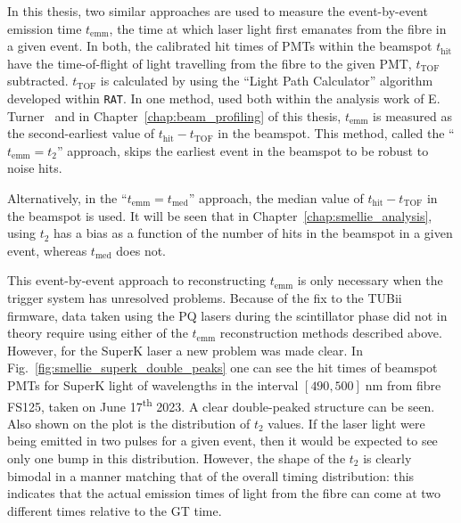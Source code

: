 In this thesis, two similar approaches are used to measure the event-by-event emission time $t_{\mathrm{emm}}$, the time at which laser light first emanates from the fibre in a given event. In both, the calibrated hit times of PMTs within the beamspot $t_{\mathrm{hit}}$ have the time-of-flight of light travelling from the fibre to the given PMT, $t_{\mathrm{TOF}}$ subtracted. $t_{\mathrm{TOF}}$ is calculated by using the ``Light Path Calculator'' algorithm developed within \texttt{RAT}. In one method, used both within the analysis work of E. Turner~\cite{turnerMeasurementScatteringCharacteristics2022} %
and in Chapter~\ref{chap:beam_profiling} of this thesis, $t_{\mathrm{emm}}$ is measured as the second-earliest value of $t_{\mathrm{hit}}-t_{\mathrm{TOF}}$ in the beamspot. This method, called the ``$t_{\mathrm{emm}} = t_{2}$'' approach, skips the earliest event in the beamspot to be robust to noise hits.

Alternatively, in the ``$t_{\mathrm{emm}} = t_{\mathrm{med}}$'' approach, the median value of $t_{\mathrm{hit}}-t_{\mathrm{TOF}}$ in the beamspot is used. It will be seen that in Chapter~\ref{chap:smellie_analysis}, using $t_{2}$ has a bias as a function of the number of hits in the beamspot in a given event, whereas $t_{\mathrm{med}}$ does not.

This event-by-event approach to reconstructing $t_{\mathrm{emm}}$ is only necessary when the trigger system has unresolved problems. Because of the fix to the TUBii firmware, data taken using the PQ lasers during the scintillator phase did not in theory require using either of the $t_{\mathrm{emm}}$ reconstruction methods described above. However, for the SuperK laser a new problem was made clear. In Fig.~\ref{fig:smellie_superk_double_peaks} one can see the hit times of beamspot PMTs for SuperK light of wavelengths in the interval $[490,500]\;\si{\nm}$ from fibre FS125, taken on June 17\textsuperscript{th} 2023. %
A clear double-peaked structure can be seen. Also shown on the plot is the distribution of $t_{2}$ values. If the laser light were being emitted in two pulses for a given event, then it would be expected to see only one bump in this distribution. However, the shape of the $t_{2}$ is clearly bimodal in a manner matching that of the overall timing distribution: this indicates that the actual emission times of light from the fibre can come at two different times relative to the GT time.

